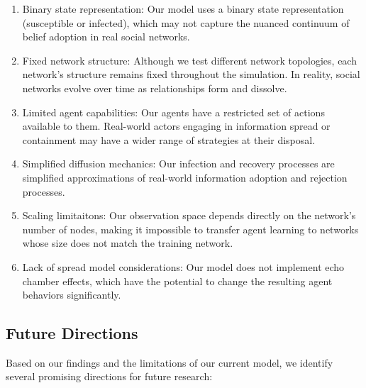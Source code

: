 \documentclass[12pt]{article}
\begin{document}
\begin{enumerate}
    \item Binary state representation: Our model uses a binary state representation (susceptible or infected), which may not capture the nuanced continuum of belief adoption in real social networks.
    
    \item Fixed network structure: Although we test different network topologies, each network's structure remains fixed throughout the simulation. In reality, social networks evolve over time as relationships form and dissolve.
    
    \item Limited agent capabilities: Our agents have a restricted set of actions available to them. Real-world actors engaging in information spread or containment may have a wider range of strategies at their disposal.
    
    \item Simplified diffusion mechanics: Our infection and recovery processes are simplified approximations of real-world information adoption and rejection processes.
    
    \item Scaling limitaitons: Our observation space 
    depends directly on the network's number of nodes, 
    making it impossible to transfer agent learning to networks whose size does not match the training network.
    
    \item Lack of spread model considerations: Our model does not implement echo chamber effects, which have the potential to change the resulting agent behaviors significantly. 
\end{enumerate}

\subsection{Future Directions}

Based on our findings and the limitations of our current model, we identify several promising directions for future research:
\end{document}
